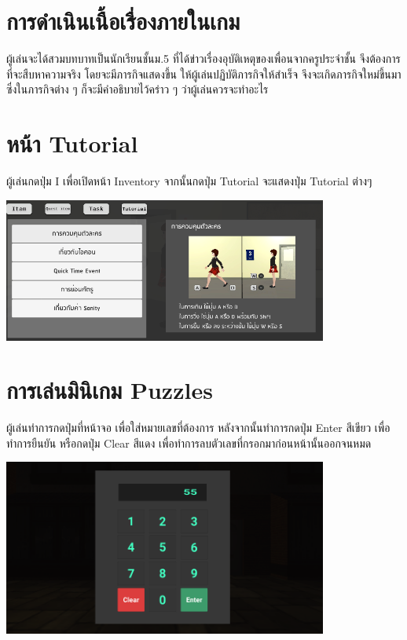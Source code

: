 \section*{การดำเนินเนื้อเรื่องภายในเกม}
ผู้เล่นจะได้สวมบทบาทเป็นนักเรียนชั้นม.5 ที่ได้ข่าวเรื่องอุบัติเหตุของเพื่อนจากครูประจำชั้น จึงต้องการที่จะสืบหาความจริง โดยจะมีภารกิจแสดงขึ้น ให้ผู้เล่นปฏิบัติภารกิจให้สำเร็จ จึงจะเกิดภารกิจใหม่ขึ้นมา ซึ่งในภารกิจต่าง ๆ ก็จะมีคำอธิบายไว้คร่าว ๆ ว่าผู้เล่นควรจะทำอะไร 

\section*{หน้า Tutorial}
ผู้เล่นกดปุ่ม I เพื่อเปิดหน้า Inventory จากนั้นกดปุ่ม Tutorial จะแสดงปุ่ม Tutorial ต่างๆ
\begin{center}
    \includegraphics[width=0.8\textwidth, height=0.25\textheight]{Images/Tutorial Image.png}
\end{center}

\section*{การเล่นมินิเกม Puzzles}
ผู้เล่นทำการกดปุ่มที่หน้าจอ เพื่อใส่หมายเลขที่ต้องการ หลังจากนั้นทำการกดปุ่ม Enter สีเขียว เพื่อทำการยืนยัน หรือกดปุ่ม Clear สีแดง เพื่อทำการลบตัวเลขที่กรอกมาก่อนหน้านั้นออกจนหมด
\begin{center}
    \includegraphics[width=0.8\textwidth, height=0.25\textheight]{Images/Insert Puzzles.png}
\end{center}

